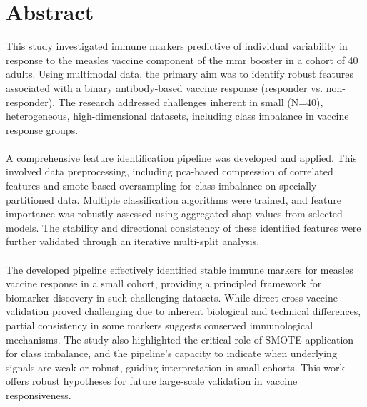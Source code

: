 \documentclass[12pt,a4paper]{report}
\begin{document}
\chapter*{Abstract}
This study investigated immune markers predictive of individual variability in response to the measles vaccine component of the \gls{mmr} booster in a cohort of 40 adults. Using multimodal data, the primary aim was to identify robust features associated with a binary antibody-based vaccine response (responder vs. non-responder). The research addressed challenges inherent in small (N=40), heterogeneous, high-dimensional datasets, including class imbalance in vaccine response groups.\\
\\
A comprehensive feature identification pipeline was developed and applied. This involved data preprocessing, including \acrshort{pca}-based compression of correlated features and \acrshort{smote}-based oversampling for class imbalance on specially partitioned data. Multiple classification algorithms were trained, and feature importance was robustly assessed using aggregated \gls{shap} values from selected models. The stability and directional consistency of these identified features were further validated through an iterative multi-split analysis.\\
\\
The developed pipeline effectively identified stable immune markers for measles vaccine response in a small cohort, providing a principled framework for biomarker discovery in such challenging datasets. While direct cross-vaccine validation proved challenging due to inherent biological and technical differences, partial consistency in some markers suggests conserved immunological mechanisms. The study also highlighted the critical role of SMOTE application for class imbalance, and the pipeline's capacity to indicate when underlying signals are weak or robust, guiding interpretation in small cohorts. This work offers robust hypotheses for future large-scale validation in vaccine responsiveness.
\end{document}
